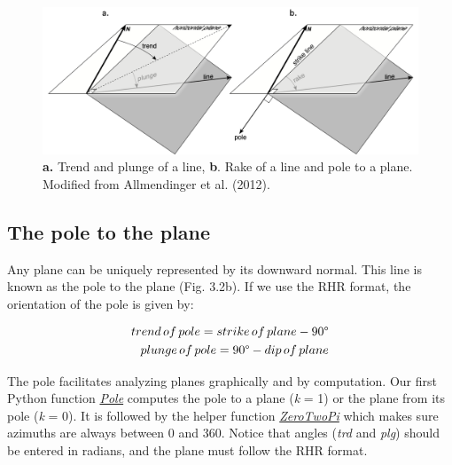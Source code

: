 \documentclass[a4paper , 12pt]{book}
\begin{document}
\begin{figure}[ht]
    \centering
    \includegraphics[width=13cm]{Figures/ch3f2.png}
    \caption{\textbf{a.} Trend and plunge of a line, \textbf{b}. Rake of a line and pole to a plane. Modified from Allmendinger et al. (2012).}
\end{figure}

\subsection{The pole to the plane}

Any plane can be uniquely represented by its downward normal. This line is known as the pole to the plane (Fig. 3.2b). If we use the RHR format, the orientation of the pole is given by:

\begin{equation}
    \begin{split}
        trend\,of\,pole = strike\,of\,plane -90\degree \\
        plunge\,of\,pole = 90\degree - dip\,of\,plane
    \end{split}
\end{equation}

The pole facilitates analyzing planes graphically and by computation. Our first Python function \href{http://github.com}{\textit{Pole}} computes the pole to a plane (\textit{k} = 1) or the plane from its pole (\textit{k} = 0). It is followed by the helper function \href{http://github.com}{\textit{ZeroTwoPi}} which makes sure azimuths are always between 0 and 360\degree. Notice that angles (\textit{trd} and \textit{plg}) should be entered in radians, and the plane must follow the RHR format.
\end{document}
